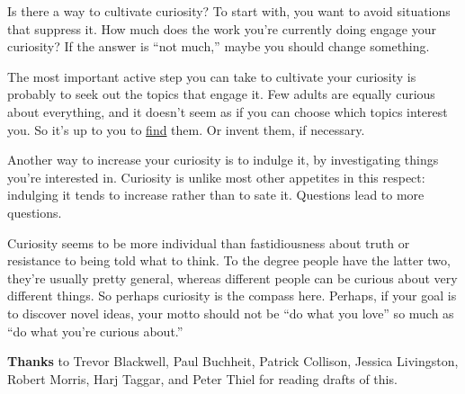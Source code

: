 Is there a way to cultivate curiosity? To start with, you want to avoid
situations that suppress it. How much does the work you're currently
doing engage your curiosity? If the answer is ``not much,'' maybe you
should change something.

The most important active step you can take to cultivate your curiosity
is probably to seek out the topics that engage it. Few adults are
equally curious about everything, and it doesn't seem as if you can
choose which topics interest you. So it's up to you to
\href{genius.html}{find} them. Or invent them, if necessary.

Another way to increase your curiosity is to indulge it, by
investigating things you're interested in. Curiosity is unlike most
other appetites in this respect: indulging it tends to increase rather
than to sate it. Questions lead to more questions.

Curiosity seems to be more individual than fastidiousness about truth or
resistance to being told what to think. To the degree people have the
latter two, they're usually pretty general, whereas different people can
be curious about very different things. So perhaps curiosity is the
compass here. Perhaps, if your goal is to discover novel ideas, your
motto should not be ``do what you love'' so much as ``do what you're
curious about.''


\textbf{Thanks} to Trevor Blackwell, Paul Buchheit, Patrick Collison,
Jessica Livingston, Robert Morris, Harj Taggar, and Peter Thiel for
reading drafts of this.